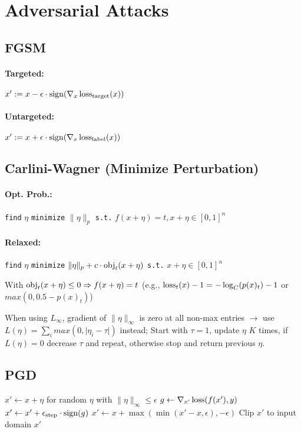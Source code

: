 \section*{Adversarial Attacks}
\subsection*{FGSM}
\paragraph{Targeted:} 
$x' := x - \epsilon \cdot \operatorname{sign}(\nabla_x \operatorname{loss}_\text{target}(x))$

\paragraph{Untargeted:}
$x' := x + \epsilon \cdot \operatorname{sign}(\nabla_x \operatorname{loss}_\text{label}(x))$

\subsection*{Carlini-Wagner (Minimize Perturbation)}
\paragraph{Opt. Prob.:} \texttt{find} $\eta$ \texttt{minimize} $\|\eta\|_p$ \texttt{s.t.} $f(x+\eta) =t, x+\eta \in [0,1]^n$
\paragraph{Relaxed:} \texttt{find} $\eta$ \texttt{minimize} $\|\eta\|_p + c \cdot \operatorname{obj}_t(x+\eta)$ \texttt{s.t.} $x+\eta \in [0,1]^n$

With $\operatorname{obj}_t(x+\eta) \le 0 \Rightarrow f(x+\eta) = t$ (e.g., $\operatorname{loss}_t(x) - 1 = -\log_C(p(x)_t) - 1$ or $max(0, 0.5- p(x)_t)$)

When using $L_\infty$, gradient of $\|\eta\|_\infty$ is zero at all non-max entries $\rightarrow$ use $L(\eta) = \sum_i max(0, \lvert \eta_i - \tau \rvert)$ instead; Start with $\tau=1$, update $\eta$ $K$ times, if $L(\eta) = 0$ decrease $\tau$ and repeat, otherwise stop and return previous $\eta$. 

\subsection*{PGD}

\begin{algorithmic}
\State $x' \gets x + \eta$ for random $\eta$ with $\|\eta\|_\infty \le \epsilon$
    \State $g \gets \nabla_{x'} \operatorname{loss}(f(x'), y)$ 
    \State $x' \gets x' +  \epsilon_\text{step} \cdot \operatorname{sign}(g)$ 
    \State $x' \gets x + \max(\min(x'-x, \epsilon), -\epsilon)$
    \State Clip $x'$ to input domain 
\EndFor
\State \Return $x'$
\EndFunction
\end{algorithmic}

